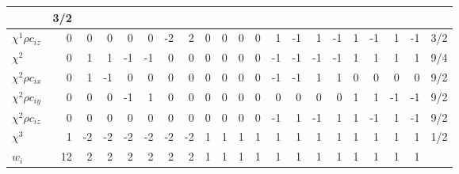 \begin{table}
\begin{tabular}{|l||r|rrrrrr|rrrr|rrrr|rrrr|r||}
& 3/2\\
\hline
$\chi^1 \rho c_{iz}$ & 0 &  0 &  0 &  0&  0 &  -2 &  2 & 
         0 &  0 &  0 &  0 &  1 &  -1 & 1 & -1 & 1 & -1 & 1 & -1
& 3/2\\
\hline
$\chi^2$ & 0 &  1 &  1 &  -1&  -1 &  0 &  0 & 
         0 &  0 &  0 &  0 &  -1 &  -1 & -1 & -1 & 1 & 1 & 1 & 1
& 9/4\\
\hline
$\chi^2 \rho c_{ix}$ & 0 &  1 &  -1 &  0&  0 &  0 &  0 & 
         0 &  0 &  0 &  0 &  -1 &  -1 & 1 & 1 & 0 & 0 & 0 & 0
& 9/2\\
\hline
$\chi^2 \rho c_{iy}$ & 0 &  0 &  0 & -1&   1 &  0 &  0 & 
         0 &  0 &  0 &  0 &   0 &  0 & 0 & 0 & 1 &  1 & -1 & -1
& 9/2\\
\hline
$\chi^2 \rho c_{iz}$ & 0 &  0 &  0 &  0&  0 &  0 &  0 & 
         0 &  0 &  0 &  0 &  -1 &  1 & -1 & 1 & 1 & -1 & 1 & -1
& 9/2\\
\hline
$\chi^3$ & 1 &  -2 &  -2 &  -2&  -2 &  -2 &  -2 & 
         1 &  1 &  1 &  1 &  1 &  1 & 1 & 1 & 1 & 1 & 1 & 1
& 1/2\\
\hline\hline
$w_i$ & 12 & 2 & 2 & 2 & 2 & 2 & 2 & 
1 & 1 & 1 & 1 & 1 & 1 & 1 & 1 & 1 & 1 & 1 & 1
& \\
\hline\hline
\end{tabular}
\end{table}



\pagebreak


